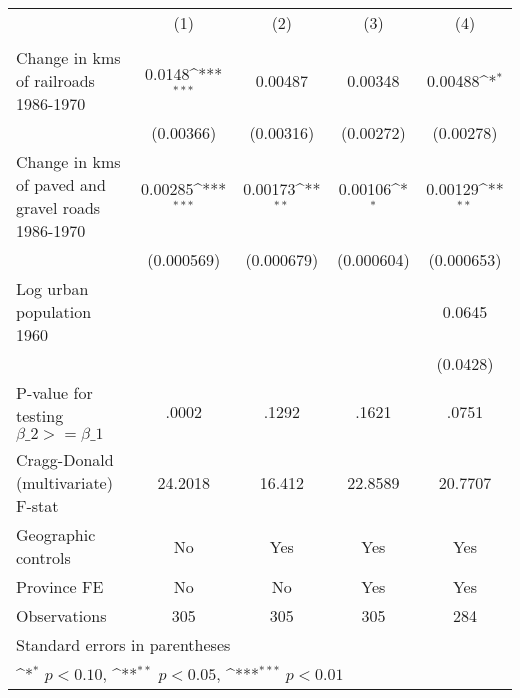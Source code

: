 {
\def\sym#1{\ifmmode^{#1}\else\(^{#1}\)\fi}
\begin{tabular}{l*{4}{c}}
\hline\hline
                &\multicolumn{1}{c}{(1)}&\multicolumn{1}{c}{(2)}&\multicolumn{1}{c}{(3)}&\multicolumn{1}{c}{(4)}\\
                &\multicolumn{1}{c}{}&\multicolumn{1}{c}{}&\multicolumn{1}{c}{}&\multicolumn{1}{c}{}\\
\hline
Change in kms of railroads 1986-1970&   0.0148\sym{***}&  0.00487         &  0.00348         &  0.00488\sym{*}  \\
                &(0.00366)         &(0.00316)         &(0.00272)         &(0.00278)         \\
[1em]
Change in kms of paved and gravel roads 1986-1970&  0.00285\sym{***}&  0.00173\sym{**} &  0.00106\sym{*}  &  0.00129\sym{**} \\
                &(0.000569)         &(0.000679)         &(0.000604)         &(0.000653)         \\
[1em]
Log urban population 1960&                  &                  &                  &   0.0645         \\
                &                  &                  &                  & (0.0428)         \\
\hline
P-value for testing $\beta\_{2} >= \beta\_{1}$&    .0002         &    .1292         &    .1621         &    .0751         \\
Cragg-Donald (multivariate) F-stat&  24.2018         &   16.412         &  22.8589         &  20.7707         \\
Geographic controls&       No         &      Yes         &      Yes         &      Yes         \\
Province FE     &       No         &       No         &      Yes         &      Yes         \\
Observations    &      305         &      305         &      305         &      284         \\
\hline\hline
\multicolumn{5}{l}{\footnotesize Standard errors in parentheses}\\
\multicolumn{5}{l}{\footnotesize \sym{*} \(p<0.10\), \sym{**} \(p<0.05\), \sym{***} \(p<0.01\)}\\
\end{tabular}
}
